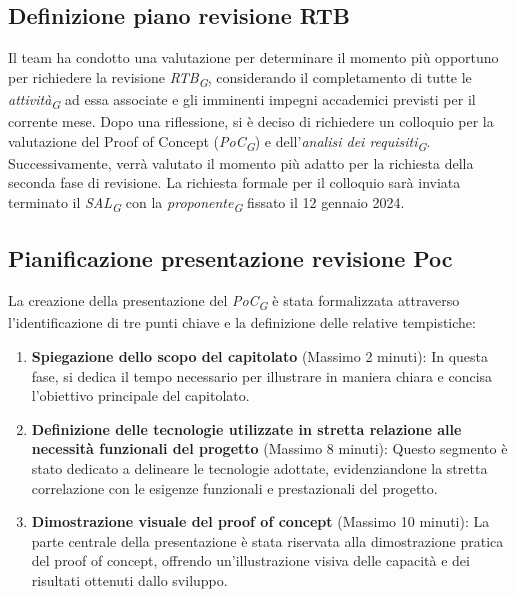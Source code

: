 \documentclass{article}
\begin{document}
\subsection{Definizione piano revisione RTB}
Il team ha condotto una valutazione per determinare il momento più opportuno per richiedere la revisione \textit{RTB}\textsubscript{\textit{G}}, considerando il completamento di tutte le \textit{attività}\textsubscript{\textit{G}} ad essa associate e gli imminenti impegni accademici previsti per il corrente mese.
Dopo una riflessione, si è deciso di richiedere un colloquio per la valutazione del Proof of Concept (\textit{PoC}\textsubscript{\textit{G}}) e dell'\textit{analisi dei requisiti}\textsubscript{\textit{G}}. Successivamente, verrà valutato il momento più adatto per la richiesta della seconda fase di revisione.
La richiesta formale per il colloquio sarà inviata terminato il \textit{SAL}\textsubscript{\textit{G}} con la \textit{proponente}\textsubscript{\textit{G}} fissato il 12 gennaio 2024.

\subsection{Pianificazione presentazione revisione Poc}
La creazione della presentazione del \textit{PoC}\textsubscript{\textit{G}} è stata formalizzata attraverso l'identificazione di tre punti chiave e la definizione delle relative tempistiche:

\begin{enumerate}
    \item \textbf{Spiegazione dello scopo del capitolato} (Massimo 2 minuti): In questa fase, si dedica il tempo necessario per illustrare in maniera chiara e concisa l'obiettivo principale del capitolato.
    
    \item \textbf{Definizione delle tecnologie utilizzate in stretta relazione alle necessità funzionali del progetto} (Massimo 8 minuti): Questo segmento è stato dedicato a delineare le tecnologie adottate, evidenziandone la stretta correlazione con le esigenze funzionali e prestazionali del progetto.
    
    \item \textbf{Dimostrazione visuale del proof of concept} (Massimo 10 minuti): La parte centrale della presentazione è stata riservata alla dimostrazione pratica del proof of concept, offrendo un'illustrazione visiva delle capacità e dei risultati ottenuti dallo sviluppo.
\end{enumerate}
\end{document}
